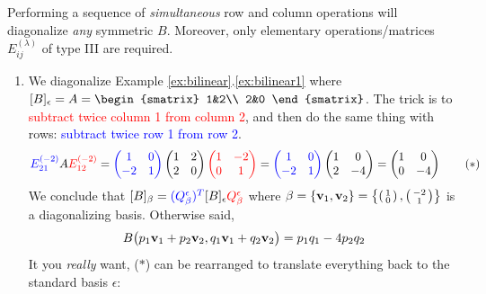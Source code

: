 \begin{examples}{}{}
	Performing a sequence of \emph{simultaneous} row and column operations will diagonalize \emph{any} symmetric $B$. Moreover, only elementary operations/matrices $E_{ij}^{(\lambda)}$ of type III are required.\footnotemark{}
	\begin{enumerate}
	  \item We diagonalize Example \ref*{ex:bilinear}.\ref{ex:bilinear1} where $[B]_\epsilon=A=
	  \begin{smatrix}
			1&2\\
			2&0
	  \end{smatrix}$. The trick is to \textcolor{red}{subtract twice column 1 from column 2}, and then do the same thing with rows: \textcolor{blue}{subtract twice row 1 from row 2}.
		\begin{gather*}
			\textcolor{blue}{E_{21}^{(-2)}}
			A
			\textcolor{red}{E_{12}^{(-2)}}
			=
			\textcolor{blue}{
				\begin{pmatrix}
					1&0\\
					-2&1
				\end{pmatrix}
			}
			\begin{pmatrix}
				1&2\\
				2&0
			\end{pmatrix}
			\textcolor{red}{
				\begin{pmatrix}
					1&-2\\
					0&1
				\end{pmatrix}
			}
			=
			\textcolor{blue}{
				\begin{pmatrix}
					1&0\\
					-2&1
				\end{pmatrix}
			}
			\begin{pmatrix}
				1&0\\
				2&-4
			\end{pmatrix}
			=
			\begin{pmatrix}
				1&0\\
				0&-4
			\end{pmatrix}
			\tag{$\ast$}
		\end{gather*}
		We conclude that $[B]_\beta=\textcolor{blue}{(Q_\beta^\epsilon)^T}[B]_\epsilon \textcolor{red}{Q_\beta^\epsilon}$ where $\beta=\{{\mathbf{v}}_1,{\mathbf{v}}_2\}=\left\{\left(\begin{smallmatrix}1\\0\end{smallmatrix}\right),\left(\begin{smallmatrix}-2\\1\end{smallmatrix}\right)\right\}$ is a diagonalizing basis. Otherwise said,
		\[
			B\big(p_1{\mathbf{v}}_1+p_2{\mathbf{v}}_2,q_1{\mathbf{v}}_1+q_2{\mathbf{v}}_2\big)=p_1q_1-4p_2q_2
		\]
		It you \emph{really} want, ($\ast$) can be rearranged to translate everything back to the standard basis $\epsilon$:
		\begin{align*}

\end{align*}
\end{enumerate}
\end{examples}
